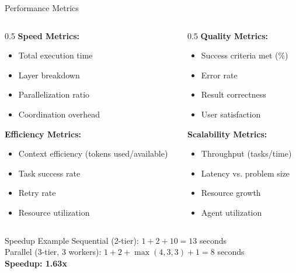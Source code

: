 \documentclass[aspectratio=169,11pt]{beamer}
\begin{document}
\begin{frame}{Performance Metrics}
    \begin{columns}[T]
        \begin{column}{0.5\textwidth}
            \textbf{Speed Metrics:}
            \begin{itemize}
                \item Total execution time
                \item Layer breakdown
                \item Parallelization ratio
                \item Coordination overhead
            \end{itemize}

            \vspace{0.3cm}
            \textbf{Efficiency Metrics:}
            \begin{itemize}
                \item Context efficiency (tokens used/available)
                \item Task success rate
                \item Retry rate
                \item Resource utilization
            \end{itemize}
        \end{column}
        \begin{column}{0.5\textwidth}
            \textbf{Quality Metrics:}
            \begin{itemize}
                \item Success criteria met (\%)
                \item Error rate
                \item Result correctness
                \item User satisfaction
            \end{itemize}

            \vspace{0.3cm}
            \textbf{Scalability Metrics:}
            \begin{itemize}
                \item Throughput (tasks/time)
                \item Latency vs. problem size
                \item Resource growth
                \item Agent utilization
            \end{itemize}
        \end{column}
    \end{columns}

    \vspace{0.3cm}
    \begin{exampleblock}{Speedup Example}
        Sequential (2-tier): $1 + 2 + 10 = 13$ seconds\\
        Parallel (3-tier, 3 workers): $1 + 2 + \max(4,3,3) + 1 = 8$ seconds\\
        \textbf{Speedup: 1.63x}
    \end{exampleblock}
\end{frame}
\end{document}
